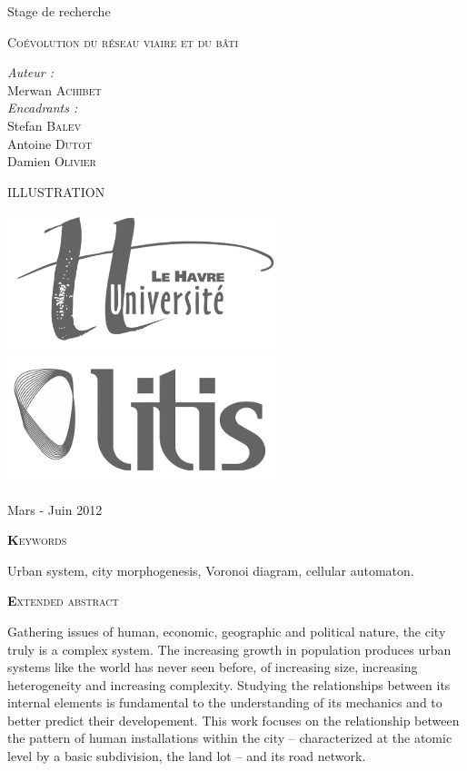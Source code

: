 \documentclass[12pt]{article}
\begin{document}
\begin{titlepage}

  Stage de recherche

  {\Large \textsc{Coévolution du réseau viaire et du bâti}}

  \begin{flushright}
    \textit{Auteur :}\\
    Merwan {\scshape Achibet}\\[0.5cm]
    \textit{Encadrants :}\\
    Stefan {\scshape Balev}\\
    Antoine {\scshape Dutot}\\
    Damien {\scshape Olivier}
  \end{flushright}

  \vfill

  \begin{center}
    ILLUSTRATION
  \end{center}

  \vfill

  \begin{center}
    \includegraphics[width=.25\linewidth]{images/logo-univ-le-havre.png}
    \qquad\qquad\qquad
    \includegraphics[width=.25\linewidth]{images/logo-litis.png}
  \end{center}

  \begin{center}
    {\small Mars - Juin 2012}
  \end{center}

\end{titlepage}

\begin{center}
  {\scshape\textbf Keywords}
\end{center}

{Urban system, city morphogenesis, Voronoi diagram, cellular automaton.}

\begin{center}
  {\scshape\textbf Extended abstract}
\end{center}

Gathering issues of human, economic, geographic and political nature,
the city truly is a complex system. The increasing growth in
population produces urban systems like the world has never seen
before, of increasing size, increasing heterogeneity and increasing
complexity. Studying the relationships between its internal elements
is fundamental to the understanding of its mechanics and to better
predict their developement. This work focuses on the relationship
between the pattern of human installations within the city --
characterized at the atomic level by a basic subdivision, the land lot
-- and its road network.
\end{document}
